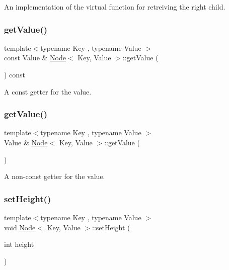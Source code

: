 An implementation of the virtual function for retreiving the right child. \mbox{\label{classNode_a8c36066d5be674c07d2b3805cc76fc08}} 
\subsubsection{\texorpdfstring{get\+Value()}{getValue()}\hspace{0.1cm}{\footnotesize\ttfamily [1/2]}}
{\footnotesize\ttfamily template$<$typename Key , typename Value $>$ \\
const Value \& \mbox{\hyperlink{classNode}{Node}}$<$ Key, Value $>$\+::get\+Value (\begin{DoxyParamCaption}{ }\end{DoxyParamCaption}) const}

A const getter for the value. \mbox{\label{classNode_abdbbc3b9627d1bfe2106c2000d410811}} 
\subsubsection{\texorpdfstring{get\+Value()}{getValue()}\hspace{0.1cm}{\footnotesize\ttfamily [2/2]}}
{\footnotesize\ttfamily template$<$typename Key , typename Value $>$ \\
Value \& \mbox{\hyperlink{classNode}{Node}}$<$ Key, Value $>$\+::get\+Value (\begin{DoxyParamCaption}{ }\end{DoxyParamCaption})}

A non-\/const getter for the value. \mbox{\label{classNode_ada6fa2c6e9c7ab2330e63ab44199ed35}} 
\subsubsection{\texorpdfstring{set\+Height()}{setHeight()}}
{\footnotesize\ttfamily template$<$typename Key , typename Value $>$ \\
void \mbox{\hyperlink{classNode}{Node}}$<$ Key, Value $>$\+::set\+Height (\begin{DoxyParamCaption}\item[{int}]{height }\end{DoxyParamCaption})}

